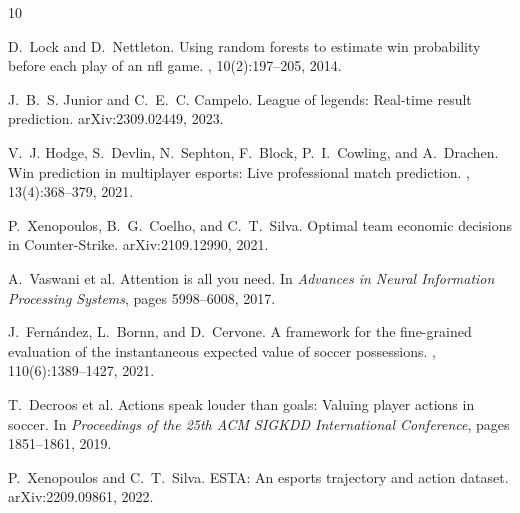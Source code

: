 \documentclass[10pt,twocolumn]{article}
\begin{document}

\begin{thebibliography}{10}

D.~Lock and D.~Nettleton.
\newblock Using random forests to estimate win probability before each play of an nfl game.
, 10(2):197--205, 2014.

J.~B.~S. Junior and C.~E.~C. Campelo.
\newblock League of legends: Real-time result prediction.
\newblock arXiv:2309.02449, 2023.

V.~J. Hodge, S.~Devlin, N.~Sephton, F.~Block, P.~I.~Cowling, and A.~Drachen.
\newblock Win prediction in multiplayer esports: Live professional match prediction.
, 13(4):368--379, 2021.

P.~Xenopoulos, B.~G.~Coelho, and C.~T.~Silva.
\newblock Optimal team economic decisions in Counter-Strike.
\newblock arXiv:2109.12990, 2021.


A.~Vaswani et al.
\newblock Attention is all you need.
\newblock In {\em Advances in Neural Information Processing Systems}, pages 5998--6008, 2017.

J.~Fern{\'a}ndez, L.~Bornn, and D.~Cervone.
\newblock A framework for the fine-grained evaluation of the instantaneous expected value of soccer possessions.
, 110(6):1389--1427, 2021.

T.~Decroos et al.
\newblock Actions speak louder than goals: Valuing player actions in soccer.
\newblock In {\em Proceedings of the 25th ACM SIGKDD International Conference}, pages 1851--1861, 2019.

P.~Xenopoulos and C.~T.~Silva.
\newblock ESTA: An esports trajectory and action dataset.
\newblock arXiv:2209.09861, 2022.

\end{thebibliography}
\end{document}
